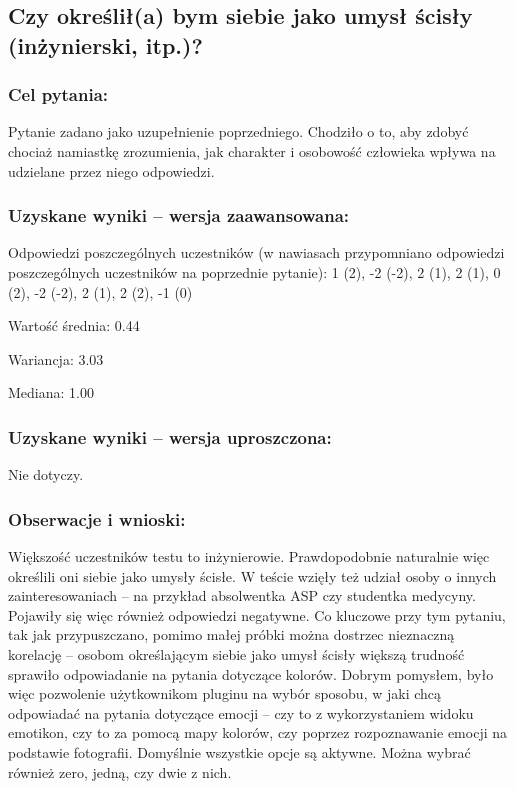 \subsection{Czy określił(a) bym siebie jako umysł ścisły (inżynierski, itp.)?}

	\subsubsection{Cel pytania:}
	
	Pytanie zadano jako uzupełnienie poprzedniego. Chodziło o to, aby zdobyć chociaż namiastkę zrozumienia, jak charakter i osobowość człowieka wpływa na udzielane przez niego odpowiedzi. 
	
	\subsubsection{Uzyskane wyniki -- wersja zaawansowana:}
	
	Odpowiedzi poszczególnych uczestników (w nawiasach przypomniano odpowiedzi poszczególnych uczestników na poprzednie pytanie): 1 (2), -2 (-2), 2 (1), 2 (1), 0 (2), -2 (-2), 2 (1), 2 (2), -1 (0)

	Wartość średnia: 0.44
	
	Wariancja: 3.03
	
	Mediana: 1.00
	
	\subsubsection{Uzyskane wyniki -- wersja uproszczona:}
	
	Nie dotyczy.
	
	\subsubsection{Obserwacje i wnioski:}
	
	Większość uczestników testu to inżynierowie. Prawdopodobnie naturalnie więc określili oni siebie jako umysły ścisłe. W teście wzięły też udział osoby o innych zainteresowaniach -- na przykład absolwentka ASP czy studentka medycyny. Pojawiły się więc również odpowiedzi negatywne. Co kluczowe przy tym pytaniu, tak jak przypuszczano, pomimo małej próbki można dostrzec nieznaczną korelację -- osobom określającym siebie jako umysł ścisły większą trudność sprawiło odpowiadanie na pytania dotyczące kolorów. Dobrym pomysłem, było więc pozwolenie użytkownikom pluginu na wybór sposobu, w jaki chcą odpowiadać na pytania dotyczące emocji -- czy to z wykorzystaniem widoku emotikon, czy to za pomocą mapy kolorów, czy poprzez rozpoznawanie emocji na podstawie fotografii. Domyślnie wszystkie opcje są aktywne. Można wybrać również zero, jedną, czy dwie z nich.
	
